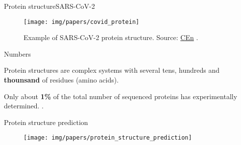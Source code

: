 \documentclass[10pt]{beamer}
\newcommand{\chref}[2]{	\href{#1}{{\usebeamercolor[bg]{Feather}#2}} }
\newcommand{\chref}[3][blue]{\href{#2}{\color{#1}{#3}}}%
\newcommand{\1}{
        	\setbeamertemplate{background}{
        		\texttt{[image: img/1]}
        		\tikz[overlay] \fill[fill opacity=0.75,fill=white] (0,0) rectangle (-\paperwidth,\paperheight);
        	}
}
\begin{document}
\begin{frame}{Protein structure}{SARS-CoV-2}	
	
	\begin{figure}
		\centering
		\texttt{[image: img/papers/covid\_protein]}
		\caption{Example of SARS-CoV-2 protein structure. Source: \chref{https://cen.acs.org/articles/98/i12/es-El-mapeo-de-protenas-encuentra-69-potenciales.html?PageSpeed=noscript}{CEn}.}
	\end{figure}
	
\end{frame}


\begin{frame}{Numbers}{}

	\begin{block}{}
		Protein structures are complex systems with several tens, hundreds and \textbf{thounsand} of residues (amino acids).	
	\end{block}	

	\begin{block}{}
		Only about \textbf{1\%} of the total number of sequenced proteins has experimentally determined. \cite{rangwala2011introduction}.
	\end{block}	

\end{frame}

\begin{frame}{Protein structure prediction}{}
	
	\begin{figure}
		\centering
		\texttt{[image: img/papers/protein\_structure\_prediction]}
	\end{figure}
	
\end{frame}
\end{document}
